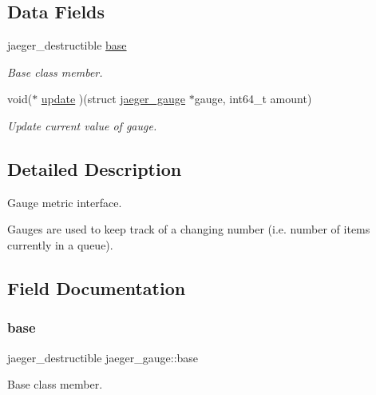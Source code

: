 \subsection*{Data Fields}
\begin{DoxyCompactItemize}
\item 
jaeger\+\_\+destructible \mbox{\hyperlink{structjaeger__gauge_a542160d18e7ee06a0ed466e4e0dfa9bd}{base}}
\begin{DoxyCompactList}\small\item\em Base class member. \end{DoxyCompactList}\item 
void($\ast$ \mbox{\hyperlink{structjaeger__gauge_a0463c13cf633754ea4cfe7588d1445a5}{update}} )(struct \mbox{\hyperlink{structjaeger__gauge}{jaeger\+\_\+gauge}} $\ast$gauge, int64\+\_\+t amount)
\begin{DoxyCompactList}\small\item\em Update current value of gauge. \end{DoxyCompactList}\end{DoxyCompactItemize}


\subsection{Detailed Description}
Gauge metric interface. 

Gauges are used to keep track of a changing number (i.\+e. number of items currently in a queue). 

\subsection{Field Documentation}
\mbox{\label{structjaeger__gauge_a542160d18e7ee06a0ed466e4e0dfa9bd}} 
\subsubsection{\texorpdfstring{base}{base}}
{\footnotesize\ttfamily jaeger\+\_\+destructible jaeger\+\_\+gauge\+::base}



Base class member. 

\mbox{\label{structjaeger__gauge_a0463c13cf633754ea4cfe7588d1445a5}} 
